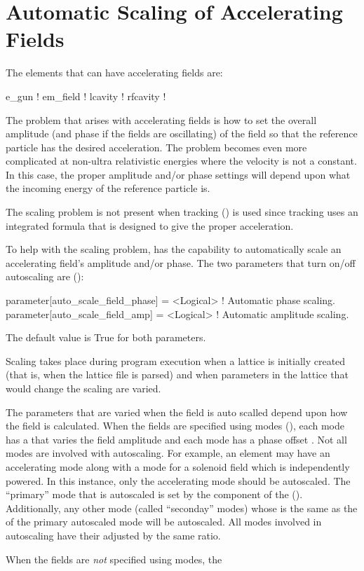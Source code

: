 \chapter{Automatic Scaling of Accelerating Fields}
\label{c:autoscale}

The elements that can have accelerating fields are:
\begin{example}
  e_gun       ! 
  em_field    ! 
  lcavity     ! 
  rfcavity    ! 
\end{example}

The problem that arises with accelerating fields is how to set the
overall amplitude (and phase if the fields are oscillating) of the
field so that the reference particle has the desired acceleration. The
problem becomes even more complicated at non-ultra relativistic
energies where the velocity is not a constant. In this case, the
proper amplitude and/or phase settings will depend upon what the
incoming energy of the reference particle is.

The scaling problem is not present when  tracking
() is used since  tracking uses an
integrated formula that is designed to give the proper acceleration.

To help with the scaling problem, \bmad has the capability to automatically
scale an accelerating field's amplitude and/or phase. The two
parameters that turn on/off autoscaling are ():
\begin{example}
  parameter[auto_scale_field_phase]    = <Logical>  ! Automatic phase scaling.
  parameter[auto_scale_field_amp]      = <Logical>  ! Automatic amplitude scaling.
\end{example}
The default value is True for both parameters. 

Scaling takes place during program execution when a lattice is
initially created (that is, when the lattice file is parsed) and when
parameters in the lattice that would change the scaling are varied.

The parameters that are varied when the field is auto scalled depend
upon how the field is calculated. When the fields are specified using
modes (), each mode has a  that
varies the field amplitude and each mode has a phase offset
. Not all modes are involved with autoscaling. For
example, an  element may have an accelerating mode along
with a mode for a solenoid field which is independently powered. In
this instance, only the accelerating mode should be autoscaled. The
``primary'' mode that is autoscaled is set by the
 component of the 
(). Additionally, any other mode (called ``seconday''
modes) whose  is the same as the  of
the primary autoscaled mode will be autoscaled. All modes involved in
autoscaling have their  adjusted by the same ratio.

When the fields are {\em not} specified using modes, the 








